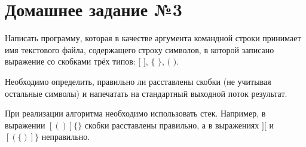 \section*{Домашнее задание №3}


Написать программу, которая в качестве аргумента командной строки
принимает имя текстового файла, содержащего строку символов, в
которой записано выражение со скобками трёх типов: $[$ $]$, $\{$ $\}$, $($ $)$.

Необходимо определить, правильно ли расставлены скобки (не учитывая
остальные символы) и напечатать на стандартный выходной поток
результат.

При реализации алгоритма необходимо использовать стек.
Например, в выражении $[()]\{\}$ скобки расставлены правильно, а в
выражениях $][$ и $[(\{)]\}$ неправильно.
